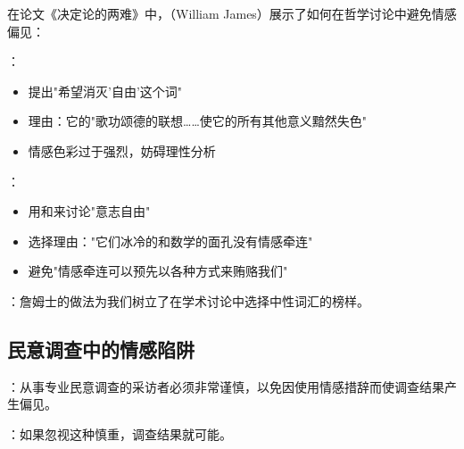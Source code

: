 \begin{examplebox}[title=威廉·詹姆士的词汇选择策略]
在论文《决定论的两难》中，（William James）展示了如何在哲学讨论中避免情感偏见：

：
\begin{itemize}
  \item 提出"希望消灭'自由'这个词"
  \item 理由：它的"歌功颂德的联想……使它的所有其他意义黯然失色"
  \item 情感色彩过于强烈，妨碍理性分析
\end{itemize}

：
\begin{itemize}
  \item 用和来讨论"意志自由"
  \item 选择理由："它们冰冷的和数学的面孔没有情感牵连"
  \item 避免"情感牵连可以预先以各种方式来贿赂我们"
\end{itemize}

：詹姆士的做法为我们树立了在学术讨论中选择中性词汇的榜样。
\end{examplebox}

\subsection{民意调查中的情感陷阱}

\begin{theorembox}[title=民意调查中的语言偏见]
：从事专业民意调查的采访者必须非常谨慎，以免因使用情感措辞而使调查结果产生偏见。

：如果忽视这种慎重，调查结果就可能。
\end{theorembox}

